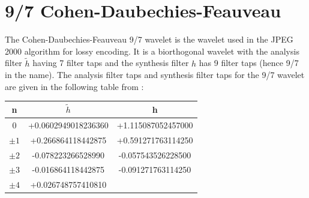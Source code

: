 \documentclass{article}
\begin{document}
\section{9/7 Cohen-Daubechies-Feauveau}
The Cohen-Daubechies-Feauveau 9/7 wavelet is the wavelet used in the JPEG 2000 algorithm for lossy encoding. It is a biorthogonal wavelet with the analysis filter \(\tilde{h}\) having 7 filter taps and the synthesis filter \(h\) has 9 filter taps (hence 9/7 in the name). 
The analysis filter taps and synthesis filter taps for the 9/7 wavelet are given in the following table from \cite{book}:
\begin{center}
\begin{tabular}{ |c | c | c| } 
 \hline
 n & \(\tilde{h}\) & h \\
 \hline
 0 & +0.0602949018236360 & +1.115087052457000 \\ 
 \(\pm1\) & +0.266864118442875 & +0.591271763114250 \\ 
 \(\pm2\) & -0.078223266528990 & -0.057543526228500 \\ 
 \(\pm3\) & -0.016864118442875 & -0.091271763114250 \\ 
 \(\pm4\) & +0.026748757410810 &  \\ 
 \hline
\end{tabular}
\end{center}
\end{document}
